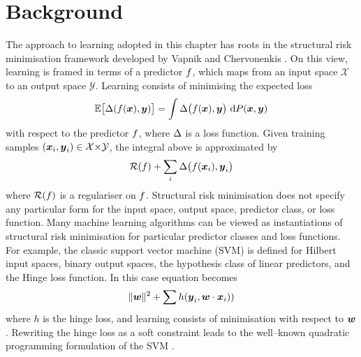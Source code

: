 \section{Background}

\newcommand\inp{\vect{x}}
\newcommand\outp{\vect{y}}

The approach to learning adopted in this chapter has roots in the
structural risk minimisation framework developed by Vapnik and
Chervonenkis \cite{Vapnik1998}. On this view, learning is framed in
terms of a predictor $\Predictor$, which maps from an input space
$\mathcal{X}$ to an output space $\mathcal{Y}$. Learning consists of
minimising the expected loss
\begin{equation}
  \label{eq:expected-utility-maximization}
  \Expected\bigl[ \Loss(f(\inp),\outp) \bigr] 
  =
  \int \Loss\bigl(\Predictor(\inp),\outp\bigr) ~ \intd P(\inp,\outp)
\end{equation}
with respect to the predictor $\Predictor$, where $\Loss$ is a loss
function. Given training samples
$(\inp_i,\outp_i)\in\mathcal{X}\cross\mathcal{Y}$, the integral above is
approximated by
\begin{equation}
  \label{eq:srm}
  \mathcal{R}(\Predictor) + \sum_i \Loss\bigl(\Predictor(\inp_i),\outp_i\bigr)
\end{equation}
where $\mathcal{R}(\Predictor)$ is a regulariser on
$\Predictor$. Structural risk minimisation does
not specify any particular form for the input space, output space,
predictor class, or loss function. Many machine learning algorithms
can be viewed as instantiations of structural risk minimisation for
particular predictor classes and loss functions. For example, the
classic support vector machine (SVM) \cite{Cortes1995} is defined for
Hilbert input spaces, binary output spaces, the hypothesis class of
linear predictors, and the Hinge loss function. In this case equation
 becomes
\begin{equation}
  \|\Model\|^2 + \sum h(\outp_i, \Model \cdot \inp_i))
\end{equation}
where $h$ is the hinge loss, and learning consists of minimisation
with respect to $\Model$. Rewriting the hinge loss as a soft
constraint leads to the well--known quadratic programming formulation
of the SVM \cite{Cortes1995}.

